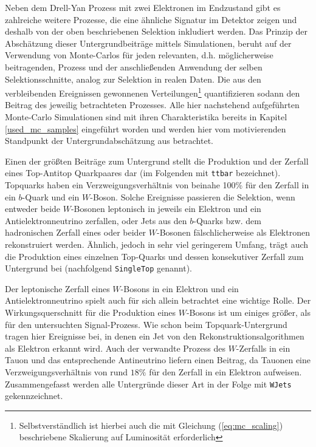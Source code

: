 
Neben dem Drell-Yan Prozess mit zwei Elektronen im Endzustand gibt es
zahlreiche weitere Prozesse, die eine ähnliche Signatur im Detektor zeigen und
deshalb von der oben beschriebenen Selektion inkludiert werden. Das Prinzip der
Abschätzung dieser Untergrundbeiträge mittels Simulationen, beruht auf der
Verwendung von Monte-Carlos für jeden relevanten, d.h. möglicherweise
beitragenden, Prozess und der anschließenden Anwendung der selben
Selektionsschnitte, analog zur Selektion in realen Daten. Die aus den
verbleibenden Ereignissen gewonnenen Verteilungen\footnote{Selbstverständlich
ist hierbei auch die mit Gleichung (\ref{eq:mc_scaling}) beschriebene
Skalierung auf Luminosität erforderlich} quantifizieren sodann den Beitrag des
jeweilig betrachteten Prozesses. Alle hier nachstehend aufgeführten Monte-Carlo
Simulationen sind mit ihren Charakteristika bereits in Kapitel
\ref{used_mc_samples} eingeführt worden und werden hier vom motivierenden
Standpunkt der Untergrundabschätzung aus betrachtet.

Einen der größten Beiträge zum Untergrund stellt die Produktion und der Zerfall
eines Top-Antitop Quarkpaares dar (im Folgenden mit \texttt{ttbar} bezeichnet).
Topquarks haben ein Verzweigungsverhältnis von beinahe 100\% für den Zerfall in
ein $b$-Quark und ein $W$-Boson. Solche Ereignisse passieren die Selektion,
wenn entweder beide $W$-Bosonen leptonisch in jeweils ein Elektron und ein
Antielektronneutrino zerfallen, oder Jets aus den $b$-Quarks bzw. dem
hadronischen Zerfall eines oder beider $W$-Bosonen fälschlicherweise als
Elektronen rekonstruiert werden. Ähnlich, jedoch in sehr viel geringerem
Umfang, trägt auch die Produktion eines einzelnen Top-Quarks und dessen
konsekutiver Zerfall zum Untergrund bei (nachfolgend \texttt{SingleTop}
genannt).

Der leptonische Zerfall eines $W$-Bosons in ein Elektron und ein
Antielektronneutrino spielt auch für sich allein betrachtet eine wichtige
Rolle. Der Wirkungsquerschnitt für die Produktion eines $W$-Bosons ist um
einiges größer, als für den untersuchten Signal-Prozess. Wie schon beim
Topquark-Untergrund tragen hier Ereignisse bei, in denen ein Jet von den
Rekonstruktionsalgorithmen als Elektron erkannt wird. Auch der verwandte
Prozess des $W$-Zerfalls in ein Tauon und das entsprechende Antineutrino
liefern einen Beitrag, da Tauonen eine Verzweigungsverhältnis von rund $18\%$
für den Zerfall in ein Elektron aufweisen. Zusammengefasst werden alle
Untergründe dieser Art in der Folge mit \texttt{WJets} gekennzeichnet.

